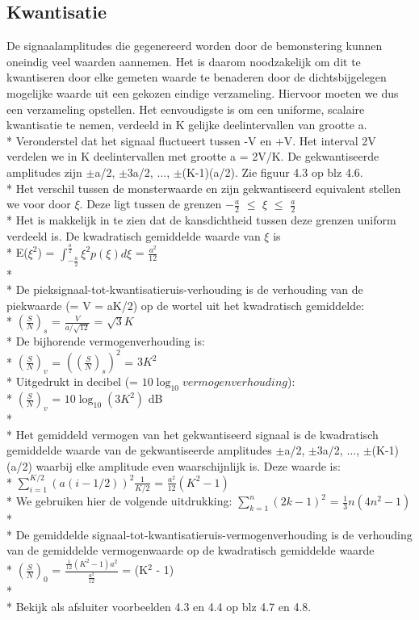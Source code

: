 \documentclass[10pt]{article}
\begin{document}
\subsection{Kwantisatie}
De signaalamplitudes die gegenereerd worden door de bemonstering kunnen oneindig veel waarden aannemen. Het is daarom noodzakelijk om dit te kwantiseren door elke gemeten waarde te benaderen door de dichtsbijgelegen mogelijke waarde uit een gekozen eindige verzameling. Hiervoor moeten we dus een verzameling opstellen. Het eenvoudigste is om een uniforme, scalaire kwantisatie te nemen, verdeeld in K gelijke deelintervallen van grootte a.\\*
Veronderstel dat het signaal fluctueert tussen -V en +V. Het interval 2V verdelen we in K deelintervallen met grootte a = 2V/K. De gekwantiseerde amplitudes zijn $\pm$a/2, $\pm$3a/2, $\dots$, $\pm$(K-1)(a/2). Zie figuur 4.3 op blz 4.6.\\*
Het verschil tussen de monsterwaarde en zijn gekwantiseerd equivalent stellen we voor door $\xi$. Deze ligt tussen de grenzen $-\frac{a}{2}$ $\leq$ $\xi$ $\leq$ $\frac{a}{2}$\\*
Het is makkelijk in te zien dat de kansdichtheid tussen deze grenzen uniform verdeeld is. De kwadratisch gemiddelde waarde van $\xi$ is\\*
E($\xi^2$) = $\int_{-\frac{a}{2}}^\frac{a}{2}\xi^2p(\xi)d\xi$ = $\frac{a^2}{12}$\\*\\*
De pieksignaal-tot-kwantisatieruis-verhouding is de verhouding van de piekwaarde (= V = aK/2) op de wortel uit het kwadratisch gemiddelde:\\*
$\left(\frac{S}{N}\right)_s$ = $\frac{V}{a/\sqrt{12}}$ = $\sqrt{3}K$\\*
De bijhorende vermogenverhouding is:\\*
$\left(\frac{S}{N}\right)_v$ = $\left(\left(\frac{S}{N}\right)_s\right)^2$ = $3K^2$\\*
Uitgedrukt in decibel (= $10\log_{10}{vermogenverhouding}$):\\*
$\left(\frac{S}{N}\right)_v$ = $10\log_{10}{(3K^2)}$ dB\\*\\*
Het gemiddeld vermogen van het gekwantiseerd signaal is de  kwadratisch gemiddelde waarde van de gekwantiseerde amplitudes $\pm$a/2, $\pm$3a/2, $\dots$, $\pm$(K-1)(a/2) waarbij elke amplitude even waarschijnlijk is. Deze waarde is:\\*
$\sum_{i=1}^{K/2}{(a(i-1/2))^2}\frac{1}{K/2}$ = $\frac{a^2}{12}(K^2-1)$\\*
{\scriptsize  We gebruiken hier de volgende uitdrukking: $\sum_{k=1}^n{(2k-1)^2}$ = $\frac{1}{3}n(4n^2-1)$}\\*\\*
De gemiddelde signaal-tot-kwantisatieruis-vermogenverhouding is de verhouding van de gemiddelde vermogenwaarde op de kwadratisch gemiddelde waarde\\*
$\left(\frac{S}{N}\right)_0$ = $\frac{\frac{1}{12}(K^2-1)a^2}{\frac{a^2}{12}}$ = (K$^2$ - 1)\\*\\*
{\scriptsize Bekijk als afsluiter voorbeelden 4.3 en 4.4 op blz 4.7 en 4.8.}
\end{document}
